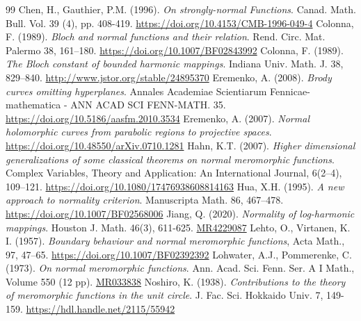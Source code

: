 \documentclass[10pt,a4paper]{amsart}
\numberwithin{equation}{section}
\begin{document}
\begin{thebibliography}{99}
 \label{chen-osnf-1996} Chen, H., Gauthier, P.M. (1996). \textit{On strongly-normal Functions}. Canad. Math. Bull. Vol. 39 (4), pp. 408-419. \url{https://doi.org/10.4153/CMB-1996-049-4}
 \label{colonna-banfatr-1989} Colonna, F. (1989). \textit{Bloch and normal functions and their relation}. Rend. Circ. Mat. Palermo 38, 161–180. \url{https://doi.org/10.1007/BF02843992}
 \label{colonna-tbcobhm-1989} Colonna, F. (1989). \textit{The Bloch constant of bounded harmonic mappings}. Indiana Univ. Math. J. 38, 829–840. \url{http://www.jstor.org/stable/24895370}
 \label{eremenko-bcoh-2008} Eremenko, A. (2008). \textit{Brody curves omitting hyperplanes}. Annales Academiae Scientiarum Fennicae-mathematica - ANN ACAD SCI FENN-MATH. 35. \url{https://doi.org/10.5186/aasfm.2010.3534}
 \label{eremenko-nhcfprtps-2007} Eremenko, A. (2007). \textit{Normal holomorphic curves from parabolic regions to projective spaces}. \url{https://doi.org/10.48550/arXiv.0710.1281}
 \label{hahn-hdgosctonmf-2007} Hahn, K.T. (2007). \textit{Higher dimensional generalizations of some classical theorems on normal meromorphic functions}. Complex Variables, Theory and Application: An International Journal, 6(2–4), 109–121. \url{https://doi.org/10.1080/17476938608814163}
 \label{hua-anatnc-1995} Hua, X.H. (1995). \textit{A new approach to normality criterion}. Manuscripta Math. 86, 467–478. \url{https://doi.org/10.1007/BF02568006}
 \label{jiang-nolm-2020} Jiang, Q. (2020). \textit{Normality of log-harmonic mappings}. Houston J. Math. 46(3), 611-625. \url{MR4229087}
 \label{lehto-bbanmf-1957} Lehto, O., Virtanen, K. I. (1957). \textit{Boundary behaviour and normal meromorphic functions}, Acta Math., 97, 47–65. \url{https://doi.org/10.1007/BF02392392}
 \label{lohwater-onmf-1973} Lohwater, A.J., Pommerenke, C. (1973). \textit{On normal meromorphic functions}. Ann. Acad. Sci. Fenn. Ser. A I Math., Volume 550 (12 pp). \url{MR033838}
 \label{noshiro-ctttomfituc-1938} Noshiro, K. (1938). \textit{Contributions to the theory of meromorphic functions in the unit circle}. J. Fac. Sci. Hokkaido Univ. 7, 149-159. \url{https://hdl.handle.net/2115/55942}

\end{thebibliography}
\end{document}
